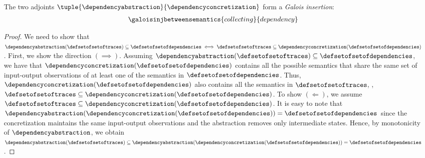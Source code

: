 \begin{theorem}
The two adjoints $\tuple{\dependencyabstraction}{\dependencyconcretization}$ form a \emph{Galois insertion}:
\begin{align*}
  \galoisinjbetweensemantics{collecting}{dependency}
\end{align*}
\end{theorem}
\begin{proof}
  We need to show that $\dependencyabstraction(\defsetofsetoftraces)\subseteq \defsetofsetofdependencies \iff \defsetofsetoftraces\subseteq\dependencyconcretization(\defsetofsetofdependencies)$.
  First, we show the direction $(\implies)$.
  Assuming $\dependencyabstraction(\defsetofsetoftraces)\subseteq \defsetofsetofdependencies$, we have that $\dependencyconcretization(\defsetofsetofdependencies)$ contains all the possible semantics that share the same set of input-output observations of at least one of the semantics in $\defsetofsetofdependencies$. Thus, $\dependencyconcretization(\defsetofsetofdependencies)$ also contains all the semantics in $\defsetofsetoftraces$, \ie, $\defsetofsetoftraces\subseteq\dependencyconcretization(\defsetofsetofdependencies)$.
  To show $(\Leftarrow)$, we assume $\defsetofsetoftraces\subseteq\dependencyconcretization(\defsetofsetofdependencies)$.
  It is easy to note that $\dependencyabstraction(\dependencyconcretization(\defsetofsetofdependencies)) = \defsetofsetofdependencies$ since the concretization maintains the same input-output observations and the abstraction removes only intermediate states.
  Hence, by monotonicity of $\dependencyabstraction$, we obtain $\dependencyabstraction(\defsetofsetoftraces)\subseteq \dependencyabstraction(\dependencyconcretization(\defsetofsetofdependencies)) = \defsetofsetofdependencies$.
\end{proof}

